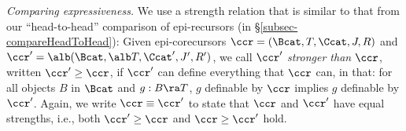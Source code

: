 \smallskip
\emph{Comparing expressiveness. }   
We use a strength relation %
that is similar to %
that from our  ``head-to-head'' comparison of epi-recursors (in \S\ref{subsec-compareHeadToHead}):
%
	Given %
	epi-corecursors $\ccr = (\Bcat,T,\Ccat,J,R)$ and $\ccr' = \alb(\Bcat,\alb T,\Ccat',J',R')$,  
	we %
	call \emph{$\ccr'$ stronger than $\ccr$}, written $\ccr' \geq \ccr$, if $\ccr'$ can define everything that  
	$\ccr$ can, %
	in that: 
	for all objects $B$ in $\Bcat$ and %
	$g: B \ra T$, %
	$g$ definable by $\ccr$ implies $g$ definable by $\ccr'$.   %
%
%
Again, we %
write $\ccr \equiv \ccr'$ to state that $\ccr$ and $\ccr'$ have equal strengths, i.e., both 
$\ccr' \geq \ccr$ and $\ccr \geq \ccr'$ hold. 
%
% 
%
{}
%

